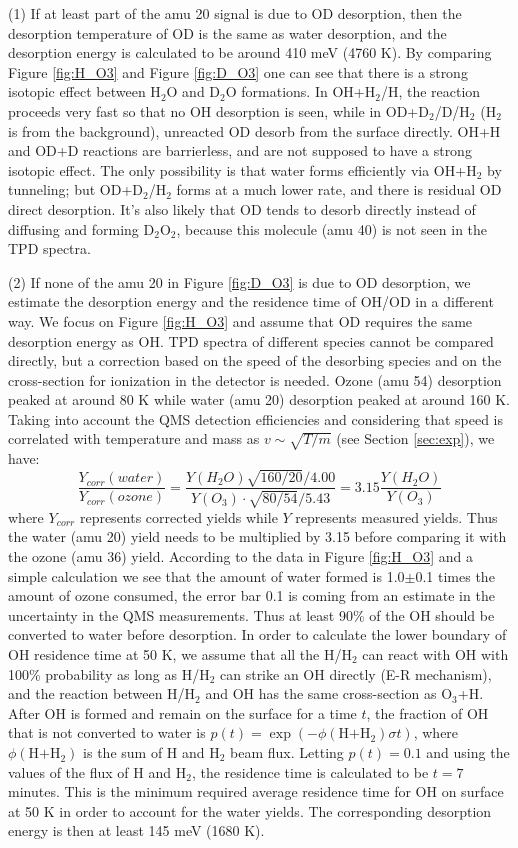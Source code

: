 \documentclass[iop]{emulateapj}
\begin{document}
(1) If at least part of the amu 20 signal is due to OD desorption, then the desorption temperature of OD is the same as water desorption, and the desorption energy is calculated to be around 410 meV (4760 K). By comparing Figure \ref{fig:H_O3} and Figure \ref{fig:D_O3} one can see that there is a strong isotopic effect between H$_2$O  and D$_2$O formations. In OH+H$_2$/H, the reaction proceeds very fast so that no OH desorption is seen, while in OD+D$_2$/D/H$_2$ (H$_2$ is from the background), unreacted OD desorb from the surface directly. OH+H and OD+D reactions are barrierless, and are not supposed to have a strong isotopic effect. The only possibility is that water forms efficiently via OH+H$_2$ by tunneling; but OD+D$_2$/H$_2$ forms at a much lower rate, and there is residual OD direct desorption. It's also likely that OD tends to desorb directly instead of diffusing and forming D$_2$O$_2$, because this molecule (amu 40) is not seen in the TPD spectra. 

(2) If none of the amu 20 in Figure \ref{fig:D_O3} is due to OD desorption, we estimate the desorption energy and the residence time of OH/OD in a different way.  We focus on  Figure \ref{fig:H_O3} and assume that OD requires the same desorption energy as OH. TPD spectra of different species cannot be compared directly, but a correction based on the speed of the desorbing species and on the cross-section for ionization in the detector is needed. Ozone (amu 54) desorption peaked at around 80 K while water (amu 20) desorption peaked at around 160 K. Taking into account the QMS detection efficiencies and considering that speed is correlated with temperature and mass as $v\sim \sqrt{T/m}$ (see Section \ref{sec:exp}), we have:
\[\frac{Y_{corr}(water)}{Y_{corr}(ozone)} =\frac{Y(H_2O) \sqrt{160/20}/4.00}{Y(O_3) \cdot \sqrt{80/54}/5.43} =3.15 \frac{Y(H_2O)}{Y(O_3)} \]
where $Y_{corr}$ represents corrected yields while $Y$ represents measured yields. Thus the water (amu 20) yield needs to be multiplied by 3.15 before comparing it with the ozone (amu 36) yield. According to the data in Figure \ref{fig:H_O3} and a simple calculation we see that the amount of water formed is 1.0$\pm$0.1 times the amount of ozone consumed, the error bar 0.1 is coming from an estimate in the uncertainty in the QMS measurements. Thus at least 90\% of the OH should be converted to water before desorption. In order to calculate the lower boundary of OH residence time at 50 K, we assume that all the H/H$_2$ can react with OH with 100\% probability as long as H/H$_2$ can strike an OH directly (E-R mechanism), and the reaction between H/H$_2$ and OH has the same cross-section as O$_3$+H. After OH is formed and remain on the surface for a time $t$, the fraction of OH that is not converted to water is $p(t)=\exp(-\phi(\text{H+H}_2) \sigma t)$, where $\phi(\text{H+H}_2)$ is the sum of H and H$_2$ beam flux. Letting $p(t)=0.1$ and using the values of the flux of H and H$_2$,  the residence time is calculated to  be $t=7$ minutes. This is the minimum required average residence time for OH on surface at 50 K in order to account for the water yields. The corresponding desorption energy is then at least 145 meV (1680 K). 
\end{document}
